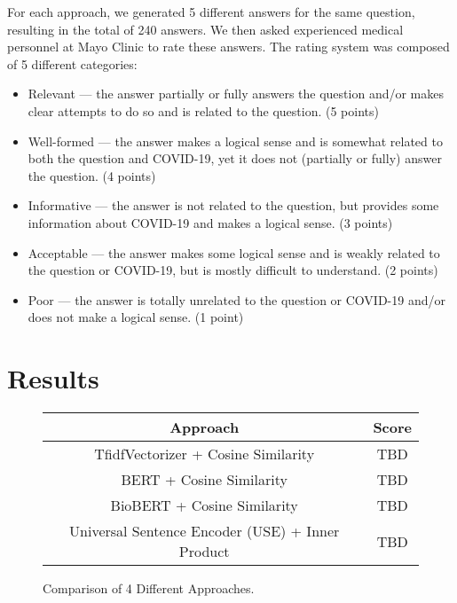 \documentclass[sigconf,natbib=false]{acmart}
\begin{document}
\noindent For each approach, we generated 5 different answers for the same
question, resulting in the total of 240 answers. We then asked experienced
medical personnel at Mayo Clinic to rate these answers. The rating system was
composed of 5 different categories:

\begin{itemize}
  \item	Relevant --- the answer partially or fully answers the question and/or
        makes clear attempts to do so and is related to the question.
        (5 points)

  \item	Well-formed --- the answer makes a logical sense and is somewhat
        related to both the question and COVID-19, yet it does not (partially
        or fully) answer the question.
        (4 points)

  \item	Informative --- the answer is not related to the question, but provides
        some information about COVID-19 and makes a logical sense.
        (3 points)

  \item	Acceptable --- the answer makes some logical sense and is weakly
        related to the question or COVID-19, but is mostly difficult to
        understand.
        (2 points)

  \item	Poor --- the answer is totally unrelated to the question or COVID-19
        and/or does not make a logical sense.
        (1 point)
\end{itemize}


\section{Results}

\begin{figure}[H]
  \centering
  \begin{tabular}{*{2}{c}}
    \toprule
    Approach & Score\\
    \midrule
    TfidfVectorizer + Cosine Similarity & TBD\\
    \midrule
    BERT + Cosine Similarity & TBD\\
    \midrule
    BioBERT + Cosine Similarity & TBD\\
    \midrule
    Universal Sentence Encoder (USE) + Inner Product & TBD\\
    \bottomrule
  \end{tabular}
  \caption{Comparison of 4 Different Approaches.}
\end{figure}
\end{document}
